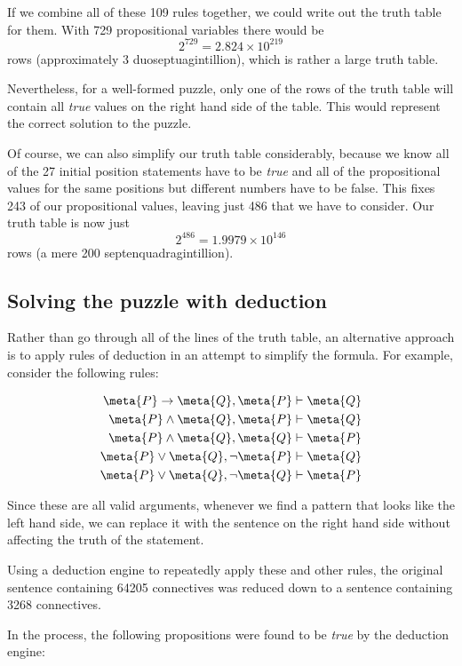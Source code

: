 \documentclass[10pt]{article}
\begin{document}
If we combine all of these 109 rules together, we could write out the truth table for them. With 729 propositional variables there would be
$$
2^{729} = 2.824 \times 10^{219}
$$
rows (approximately 3 duoseptuagintillion), which is rather a large truth table.

Nevertheless, for a well-formed puzzle, only one of the rows of the truth table will contain all {\it true} values on the right hand side of the table. This would represent the correct solution to the puzzle.

Of course, we can also simplify our truth table considerably, because we know all of the 27 initial position statements have to be {\it true} and all of the propositional values for the same positions but different numbers have to be false. This fixes 243 of our propositional values, leaving just 486 that we have to consider. Our truth table is now just
$$
2^{486} = 1.9979 \times 10^{146}
$$
rows (a mere 200 septenquadragintillion).

\subsection{Solving the puzzle with deduction}

Rather than go through all of the lines of the truth table, an alternative approach is to apply rules of deduction in an attempt to simplify the formula. For example, consider the following rules:

\begin{align*}
\meta{P} \rightarrow \meta{Q}, \meta{P} & \vdash \meta{Q} \\
\meta{P} \land \meta{Q}, \meta{P} & \vdash \meta{Q} \\
\meta{P} \land \meta{Q}, \meta{Q} & \vdash \meta{P} \\
\meta{P} \lor \meta{Q}, \lnot \meta{P} & \vdash \meta{Q} \\
\meta{P} \lor \meta{Q}, \lnot \meta{Q} & \vdash \meta{P}
\end{align*}

Since these are all valid arguments, whenever we find a pattern that looks like the left hand side, we can replace it with the sentence on the right hand side without affecting the truth of the statement.

Using a deduction engine to repeatedly apply these and other rules, the original sentence containing 64205 connectives was reduced down to a sentence containing 3268 connectives.

In the process, the following propositions were found to be {\it true} by the deduction engine:
\end{document}
